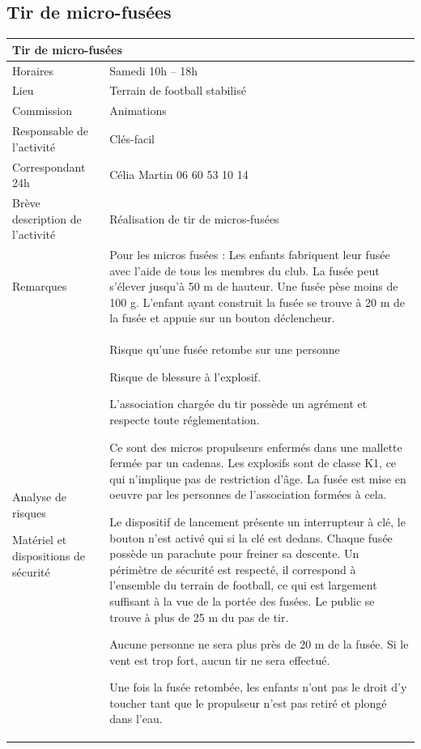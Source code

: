 \documentclass[hidelinks, paper=a4, fontsize=13pt]{report}
\begin{document}
\subsection{Tir de micro-fusées}

\begin{center}
\begin{tabular}{ | p{6cm} | p{10cm} | }
\hline
	\multicolumn{2}{|l|}{Tir de micro-fusées}  \\ \hline
	Horaires & Samedi 10h – 18h \\ \hline
	Lieu & Terrain de football stabilisé \\ \hline
	Commission & Animations \\ \hline
	Responsable de l'activité & Clés-facil \\ \hline
	Correspondant 24h & Célia Martin 06 60 53 10 14 \\ \hline
	Brève description de l'activité & Réalisation de tir de micros-fusées \\ \hline
	Remarques & Pour les micros fusées :
Les enfants fabriquent leur fusée avec l’aide de tous les membres du club. La fusée peut s’élever jusqu’à 50 m de hauteur. Une fusée pèse moins de 100 g. L’enfant ayant construit la fusée se trouve à 20 m de la fusée et appuie sur un bouton déclencheur. \\ \hline
	Analyse de risques
	
Matériel et dispositions de sécurité & Risque qu’une fusée retombe sur une personne

Risque de blessure à l’explosif.

L’association chargée du tir possède un agrément et respecte toute réglementation.

Ce sont des micros propulseurs enfermés dans une mallette fermée par un cadenas. Les explosifs sont de classe K1, ce qui n’implique pas de restriction d’âge. La fusée est mise en oeuvre par les personnes de l’association formées à cela.

Le dispositif de lancement présente un interrupteur à clé, le bouton n’est activé qui si la clé est dedans.
Chaque fusée possède un parachute pour freiner sa descente. Un périmètre de sécurité est respecté, il correspond à l’ensemble du terrain de football, ce qui est largement suffisant à la vue de la portée des fusées. Le public se trouve à plus de 25 m du pas de tir.

Aucune personne ne sera plus près de 20 m de la fusée. Si le vent est trop fort, aucun tir ne sera effectué.

Une fois la fusée retombée, les enfants n’ont pas le droit d’y toucher tant que le propulseur n’est pas retiré et plongé dans l’eau.  \\ \hline
\end{tabular}

\end{center}
\newpage
\end{document}
